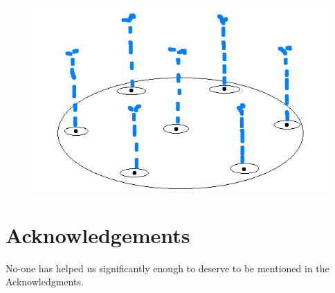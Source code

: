 \begin{figure}
\centering
\includegraphics[width=5.5in]{Splash_Pad_Paint.png}
\end{figure}

\maketitle

\newpage



\section*{Acknowledgements}

No-one has helped us significantly enough to deserve to be mentioned in the Acknowledgments.






